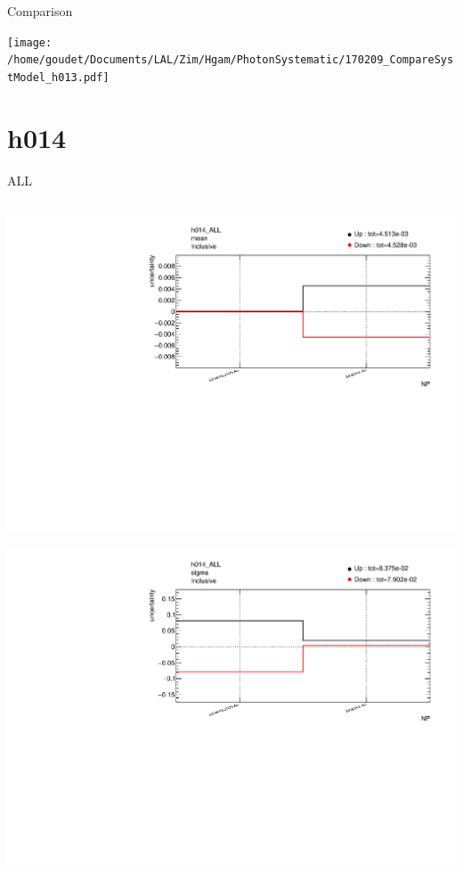 \documentclass[bigger]{beamer}
\begin{document}
\begin{frame}[label={sec:org0af9940}]{Comparison}
\begin{center}
\texttt{[image: /home/goudet/Documents/LAL/Zim/Hgam/PhotonSystematic/170209\_CompareSystModel\_h013.pdf]}
\end{center}
\end{frame}
\section{h014}
\label{sec:org25b2903}
\begin{frame}[label={sec:orgc589fb6}]{ALL}
\begin{columns}
\begin{column}{0.5\columnwidth}
\begin{center}
\includegraphics[width=\linewidth]{./plots/h014_ALL_Systematics_Inclusive_mean_mean.pdf}
\end{center}
\begin{center}
\includegraphics[width=\linewidth]{./plots/h014_ALL_Systematics_Inclusive_sigma_sigma.pdf}
\end{center}
\end{column}


\end{columns}
\end{frame}
\end{document}
